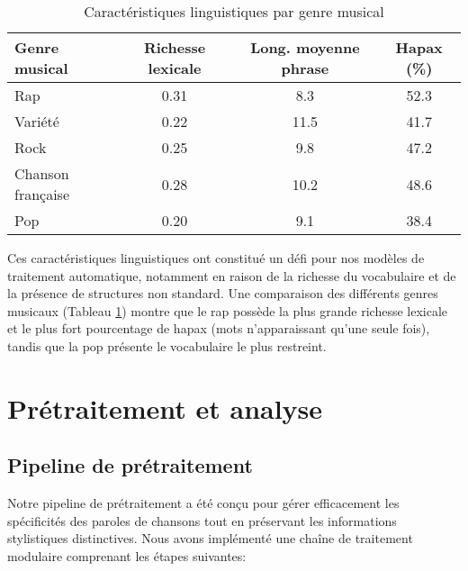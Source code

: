 \documentclass[a4paper,11pt]{article}
\begin{document}
\begin{table}[h]
\centering
\begin{tabular}{lccc}
\toprule
\textbf{Genre musical} & \textbf{Richesse lexicale} & \textbf{Long. moyenne phrase} & \textbf{Hapax (\%)} \\
\midrule
Rap & 0.31 & 8.3 & 52.3 \\
Variété & 0.22 & 11.5 & 41.7 \\
Rock & 0.25 & 9.8 & 47.2 \\
Chanson française & 0.28 & 10.2 & 48.6 \\
Pop & 0.20 & 9.1 & 38.4 \\
\bottomrule
\end{tabular}
\caption{Caractéristiques linguistiques par genre musical}
\label{tab:genre-linguistique}
\end{table}

Ces caractéristiques linguistiques ont constitué un défi pour nos modèles de traitement automatique, notamment en raison de la richesse du vocabulaire et de la présence de structures non standard. Une comparaison des différents genres musicaux (Tableau \ref{tab:genre-linguistique}) montre que le rap possède la plus grande richesse lexicale et le plus fort pourcentage de hapax (mots n'apparaissant qu'une seule fois), tandis que la pop présente le vocabulaire le plus restreint.

\section{Prétraitement et analyse}
\label{sec:preprocessing}

\subsection{Pipeline de prétraitement}
Notre pipeline de prétraitement a été conçu pour gérer efficacement les spécificités des paroles de chansons tout en préservant les informations stylistiques distinctives. Nous avons implémenté une chaîne de traitement modulaire comprenant les étapes suivantes:
\end{document}
